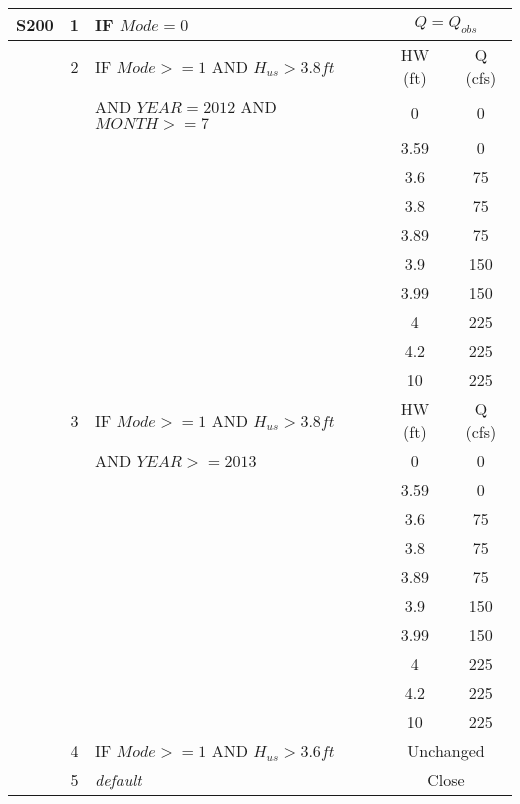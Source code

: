 \begin{table}[!h]
\begin{tabular}{|l|c|l|c|c|}
S200          &  1  & IF $Mode=0$                            & \multicolumn{2}{|c|}{$Q = Q_{obs}$}   \\
\hline
              &  2  & IF $Mode>=1$ AND $H_{us}>3.8ft$        & HW (ft) & Q (cfs)  \\
              &     & AND $YEAR = 2012$ AND $MONTH >=7$      & 0	&  0      \\
              &     &                                        & 3.59	&  0      \\
              &     &                                        & 3.6	&  75   \\
              &     &                                        & 3.8	&  75   \\
              &     &                                        & 3.89	&  75   \\
              &     &                                        & 3.9	&  150  \\
              &     &                                        & 3.99	&  150  \\
              &     &                                        & 4	&  225  \\
              &     &                                        & 4.2	&  225  \\
              &     &                                        & 10	&  225  \\
\hline
              &  3  & IF $Mode>=1$ AND $H_{us}>3.8ft$        & HW (ft) & Q (cfs)  \\
              &     & AND $YEAR >= 2013$                     & 0	&  0      \\
              &     &                                        & 3.59	&  0      \\
              &     &                                        & 3.6	&  75   \\
              &     &                                        & 3.8	&  75   \\
              &     &                                        & 3.89	&  75   \\
              &     &                                        & 3.9	&  150  \\
              &     &                                        & 3.99	&  150  \\
              &     &                                        & 4	&  225  \\
              &     &                                        & 4.2	&  225  \\
              &     &                                        & 10	&  225  \\
\hline
              &  4  & IF $Mode>=1$ AND $H_{us}>3.6ft$        & \multicolumn{2}{|c|}{Unchanged}   \\
\hline
              &  5  & \it{default}                           & \multicolumn{2}{|c|}{Close}           \\
\hline
\hline
\end{tabular}
\end{table}
\normalsize

